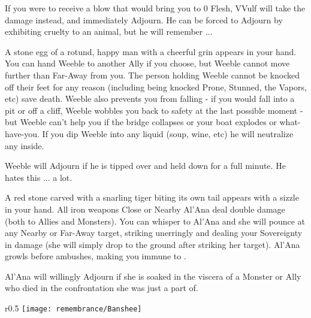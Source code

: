 If you were to receive a blow that would bring you to 0 Flesh, VVulf will take the damage instead, and immediately Adjourn.  He can be forced to Adjourn by exhibiting cruelty to an animal, but he will remember ...


A stone egg of a rotund, happy man with a cheerful grin appears in your hand. You can hand Weeble to another Ally if you choose, but Weeble cannot move further than Far-Away from you. The person holding Weeble cannot be knocked off their feet for any reason (including being knocked Prone, Stunned, the Vapors, etc) save death. Weeble also prevents you from falling - if you would fall into a pit or off a cliff, Weeble wobbles you back to safety at the last possible moment - but Weeble can't help you if the bridge collapses or your boat explodes or what-have-you.  If you dip Weeble into any liquid (soup, wine, etc) he will neutralize any  inside.

Weeble will Adjourn if he is tipped over and held down for a full minute. He hates this ... a lot. 





A red stone carved with a snarling tiger biting its own tail appears with a sizzle in your hand.  All iron weapons Close or Nearby Al'Ana deal double damage (both to Allies and Monsters).  You can whisper to Al'Ana and she will pounce at any Nearby or Far-Away target, striking unerringly and dealing your Sovereignty in damage (she will simply drop to the ground after striking her target). Al'Ana growls before ambushes, making you immune to .

Al'Ana will willingly Adjourn if she is soaked in the viscera of a Monster or Ally who died in the confrontation she was just a part of.


\begin{wrapfigure}{r}{0.5\textwidth}
    \texttt{[image: remembrance/Banshee]}
\end{wrapfigure}



